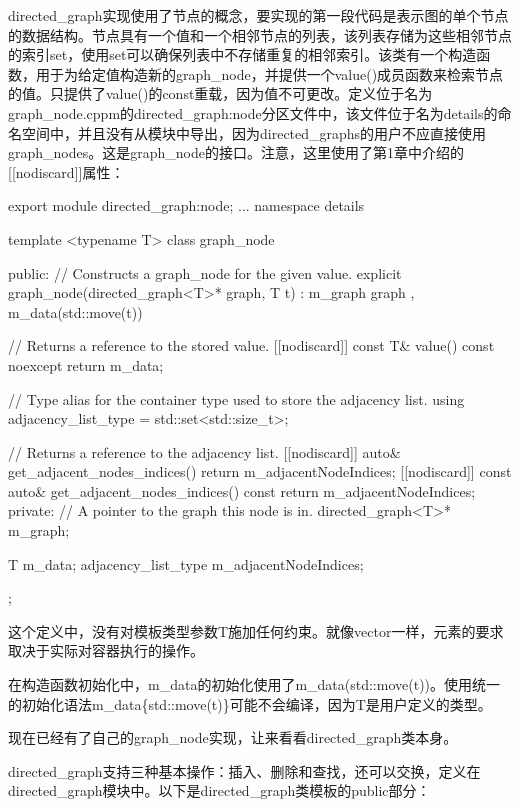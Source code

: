 directed\_graph实现使用了节点的概念，要实现的第一段代码是表示图的单个节点的数据结构。节点具有一个值和一个相邻节点的列表，该列表存储为这些相邻节点的索引set，使用set可以确保列表中不存储重复的相邻索引。该类有一个构造函数，用于为给定值构造新的graph\_node，并提供一个value()成员函数来检索节点的值。只提供了value()的const重载，因为值不可更改。定义位于名为graph\_node.cppm的directed\_graph:node分区文件中，该文件位于名为details的命名空间中，并且没有从模块中导出，因为directed\_graphs的用户不应直接使用graph\_nodes。这是graph\_node的接口。注意，这里使用了第1章中介绍的[[nodiscard]]属性：

\begin{cpp}
export module directed_graph:node;
...
namespace details
{
    template <typename T>
    class graph_node
    {
        public:
            // Constructs a graph_node for the given value.
            explicit graph_node(directed_graph<T>* graph, T t)
            : m_graph { graph }, m_data(std::move(t)) { }

            // Returns a reference to the stored value.
            [[nodiscard]] const T& value() const noexcept { return m_data; }

            // Type alias for the container type used to store the adjacency list.
            using adjacency_list_type = std::set<std::size_t>;

            // Returns a reference to the adjacency list.
            [[nodiscard]] auto& get_adjacent_nodes_indices() {
                return m_adjacentNodeIndices; }
            [[nodiscard]] const auto& get_adjacent_nodes_indices() const {
                return m_adjacentNodeIndices; }
        private:
            // A pointer to the graph this node is in.
            directed_graph<T>* m_graph;

            T m_data;
            adjacency_list_type m_adjacentNodeIndices;
    };
}
\end{cpp}

这个定义中，没有对模板类型参数T施加任何约束。就像vector一样，元素的要求取决于实际对容器执行的操作。

在构造函数初始化中，m\_data的初始化使用了m\_data(std::move(t))。使用统一的初始化语法m\_data\{std::move(t)\}可能不会编译，因为T是用户定义的类型。

现在已经有了自己的graph\_node实现，让来看看directed\_graph类本身。


directed\_graph支持三种基本操作：插入、删除和查找，还可以交换，定义在directed\_graph模块中。以下是directed\_graph类模板的public部分：

